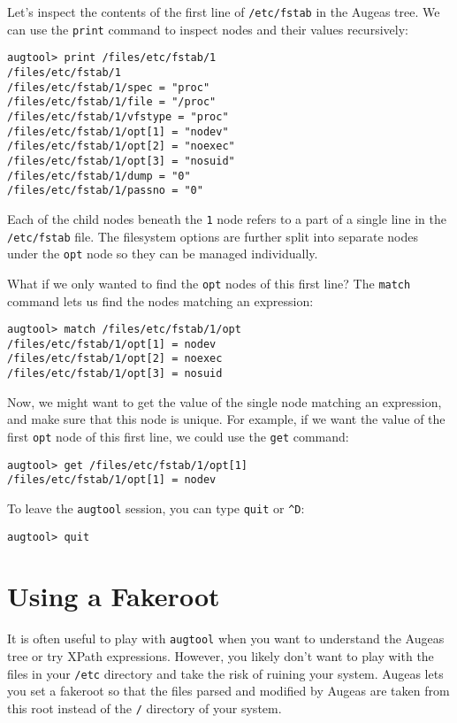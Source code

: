 Let's inspect the contents of the first line of \verb!/etc/fstab! in the Augeas tree. We can use the \verb!print! command to inspect nodes and their values recursively:

\begin{verbatim}
augtool> print /files/etc/fstab/1
/files/etc/fstab/1
/files/etc/fstab/1/spec = "proc"
/files/etc/fstab/1/file = "/proc"
/files/etc/fstab/1/vfstype = "proc"
/files/etc/fstab/1/opt[1] = "nodev"
/files/etc/fstab/1/opt[2] = "noexec"
/files/etc/fstab/1/opt[3] = "nosuid"
/files/etc/fstab/1/dump = "0"
/files/etc/fstab/1/passno = "0"
\end{verbatim}
Each of the child nodes beneath the \verb!1! node refers to a part of a single line in the \verb!/etc/fstab! file. The filesystem options are further split into separate nodes under the \verb!opt! node so they can be managed individually.

What if we only wanted to find the \verb!opt! nodes of this first line? The \verb!match! command lets us find the nodes matching an expression:


\begin{verbatim}
augtool> match /files/etc/fstab/1/opt
/files/etc/fstab/1/opt[1] = nodev
/files/etc/fstab/1/opt[2] = noexec
/files/etc/fstab/1/opt[3] = nosuid
\end{verbatim}
Now, we might want to get the value of the single node matching an expression, and make sure that this node is unique. For example, if we want the value of the first \verb!opt! node of this first line, we could use the \verb!get! command:

\begin{verbatim}
augtool> get /files/etc/fstab/1/opt[1]
/files/etc/fstab/1/opt[1] = nodev
\end{verbatim}

To leave the \verb!augtool! session, you can type \verb!quit! or \verb!^D!:

\begin{verbatim}
augtool> quit
\end{verbatim}
\section{Using a Fakeroot}

It is often useful to play with \verb!augtool! when you want to understand the Augeas tree or try XPath expressions. However, you likely don't want to play with the files in your \verb!/etc! directory and take the risk of ruining your system. Augeas lets you set a fakeroot so that the files parsed and modified by Augeas are taken from this root instead of the \verb!/! directory of your system.

